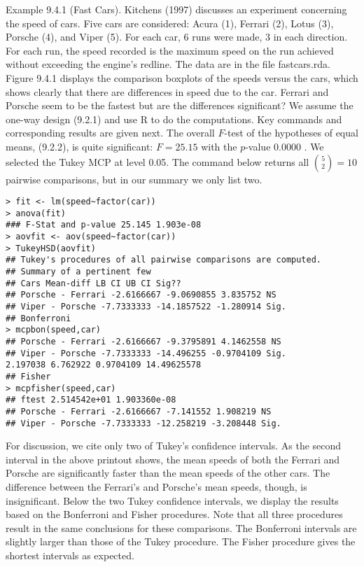 Example 9.4.1 (Fast Cars). Kitchens (1997) discusses an experiment concerning the speed of cars. Five cars are considered: Acura (1), Ferrari (2), Lotus (3), Porsche (4), and Viper (5). For each car, 6 runs were made, 3 in each direction. For each run, the speed recorded is the maximum speed on the run achieved without exceeding the engine's redline. The data are in the file fastcars.rda. Figure 9.4.1 displays the comparison boxplots of the speeds versus the cars, which shows clearly that there are differences in speed due to the car. Ferrari and Porsche seem to be the fastest but are the differences significant? We assume the one-way design (9.2.1) and use R to do the computations. Key commands and corresponding results are given next. The overall $F$-test of the hypotheses of equal means, (9.2.2), is quite significant: $F=25.15$ with the $p$-value 0.0000 . We selected the Tukey MCP at level 0.05. The command below returns all $\binom{5}{2}=10$ pairwise comparisons, but in our summary we only list two.


\begin{verbatim}
> fit <- lm(speed~factor(car))
> anova(fit)
### F-Stat and p-value 25.145 1.903e-08
> aovfit <- aov(speed~factor(car))
> TukeyHSD(aovfit)
## Tukey's procedures of all pairwise comparisons are computed.
## Summary of a pertinent few
## Cars Mean-diff LB CI UB CI Sig??
## Porsche - Ferrari -2.6166667 -9.0690855 3.835752 NS
## Viper - Porsche -7.7333333 -14.1857522 -1.280914 Sig.
## Bonferroni
> mcpbon(speed,car)
## Porsche - Ferrari -2.6166667 -9.3795891 4.1462558 NS
## Viper - Porsche -7.7333333 -14.496255 -0.9704109 Sig.
2.197038 6.762922 0.9704109 14.49625578
## Fisher
> mcpfisher(speed,car)
## ftest 2.514542e+01 1.903360e-08
## Porsche - Ferrari -2.6166667 -7.141552 1.908219 NS
## Viper - Porsche -7.7333333 -12.258219 -3.208448 Sig.
\end{verbatim}

For discussion, we cite only two of Tukey's confidence intervals. As the second interval in the above printout shows, the mean speeds of both the Ferrari and Porsche are significantly faster than the mean speeds of the other cars. The difference between the Ferrari's and Porsche's mean speeds, though, is insignificant. Below the two Tukey confidence intervals, we display the results based on the Bonferroni and Fisher procedures. Note that all three procedures result in the same conclusions for these comparisons. The Bonferroni intervals are slightly larger than those of the Tukey procedure. The Fisher procedure gives the shortest intervals as expected.

